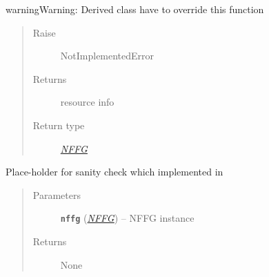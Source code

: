 \documentclass[letterpaper,10pt,english]{sphinxmanual}
\begin{document}
\begin{fulllineitems}
\begin{fulllineitems}
\begin{notice}{warning}{Warning:}
Derived class have to override this function
\end{notice}
\begin{quote}\begin{description}
\item[{Raise}] \leavevmode
NotImplementedError

\item[{Returns}] \leavevmode
resource info

\item[{Return type}] \leavevmode
{\hyperref[util/nffg:escape.util.nffg.NFFG]{\emph{NFFG}}}

\end{description}\end{quote}

\end{fulllineitems}


\begin{fulllineitems}
\label{orchest/virtualization_mgmt:escape.orchest.virtualization_mgmt.AbstractVirtualizer.sanity_check}
Place-holder for sanity check which implemented in
\begin{quote}\begin{description}
\item[{Parameters}] \leavevmode
\textbf{\texttt{nffg}} ({\hyperref[util/nffg:escape.util.nffg.NFFG]{\emph{\emph{NFFG}}}}) -- NFFG instance

\item[{Returns}] \leavevmode
None

\end{description}\end{quote}

\end{fulllineitems}


\end{fulllineitems}

\end{document}

